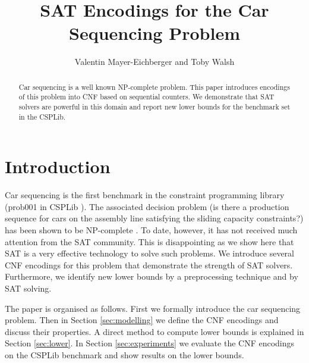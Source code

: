 \documentclass[]{easychair}
\author{Valentin Mayer-Eichberger and Toby Walsh}
\institute{NICTA and University of New South Wales \\
Locked Bag 6016, Sydney NSW 1466, Australia 
\email{\{valentin.mayer-eichberger,toby.walsh\}@nicta.com.au}
}
\title{SAT Encodings for the Car Sequencing Problem}
\begin{document}
 

\maketitle

\begin{abstract} 
    Car sequencing is a well known NP-complete problem. This paper introduces encodings of this problem into CNF based
    on sequential counters. We demonstrate that SAT solvers are powerful in this domain and report new lower bounds for
    the benchmark set in the CSPLib.
\end{abstract}

\section{Introduction}

Car sequencing is the first benchmark in the constraint programming library (prob001 in CSPLib \cite{Gent99}). The
associated decision problem (is there a production sequence for cars on the assembly line satisfying the sliding
capacity constraints?) has been shown to be NP-complete \cite{Kis04}\cite{Gent98}.  To date, however, it has not
received much attention from the SAT community.  This is disappointing as we show here that SAT is a very effective
technology to solve such problems. We introduce several CNF encodings for this problem that demonstrate the strength of
SAT solvers. Furthermore, we identify new lower bounds by a preprocessing technique and by SAT solving.

The paper is organised as follows. First we formally introduce the car sequencing problem. Then in Section
\ref{sec:modelling} we define the CNF encodings and discuss their properties. A direct method to compute lower bounds is
explained in Section \ref{sec:lower}. In Section \ref{sec:experiments} we evaluate the CNF encodings on the CSPLib
benchmark and show results on the lower bounds. 
\end{document}
